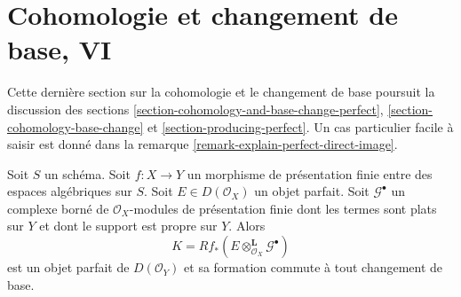 \section{Cohomologie et changement de base, VI}
\label{section-cohomology-and-base-change-final}

\noindent
Cette dernière section sur la cohomologie et le changement de base poursuit
la discussion des sections
\ref{section-cohomology-and-base-change-perfect},
\ref{section-cohomology-base-change} et
\ref{section-producing-perfect}.
Un cas particulier facile à saisir est donné dans
la remarque \ref{remark-explain-perfect-direct-image}.

\begin{lemma}
\label{lemma-base-change-tensor-perfect}
Soit $S$ un schéma. Soit $f : X \to Y$ un morphisme de présentation finie
entre des espaces algébriques sur $S$. Soit $E \in D(\mathcal{O}_X)$ un objet
parfait. Soit $\mathcal{G}^\bullet$ un complexe borné de
$\mathcal{O}_X$-modules de présentation finie dont les termes sont plats sur
$Y$ et dont le support est propre sur $Y$. Alors
$$
K = Rf_*(E \otimes_{\mathcal{O}_X}^\mathbf{L} \mathcal{G}^\bullet)
$$
est un objet parfait de $D(\mathcal{O}_Y)$ et sa formation
commute à tout changement de base.
\end{lemma}

